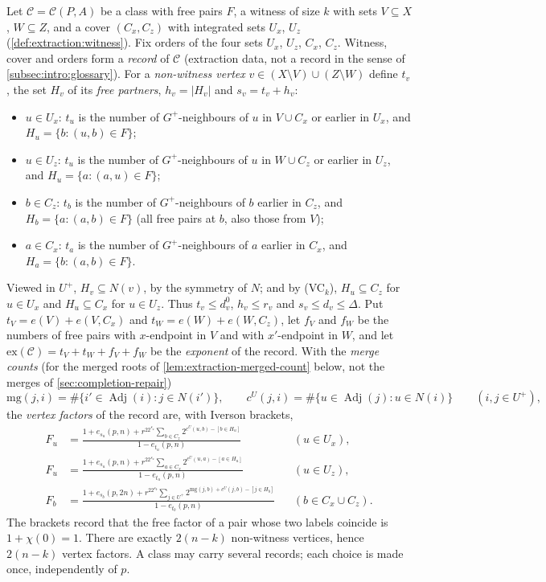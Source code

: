 \begin{definition}\label{def:extraction:records}
Let $\mathcal C=\mathcal C(P,A)$ be a class with free pairs $F$, a witness of
size $k$ with sets $V\subseteq X$, $W\subseteq Z$, and a cover $(C_x,C_z)$ with
integrated sets $U_x$, $U_z$ (\cref{def:extraction:witness}). Fix orders of the
four sets $U_x$, $U_z$, $C_x$, $C_z$. Witness, cover and orders form a
\emph{record} of $\mathcal C$ (extraction data, not a record in the sense of
\cref{subsec:intro:glossary}). For a \emph{non-witness vertex}
$v\in(X\setminus V)\cup(Z\setminus W)$ define $t_v$, the set $H_v$ of its \emph{free
partners}, $h_v=|H_v|$ and $s_v=t_v+h_v$:
\begin{itemize}
\item $u\in U_x$: $t_u$ is the number of $G^+$-neighbours of $u$ in $V\cup C_x$
 or earlier in $U_x$, and $H_u=\{b:(u,b)\in F\}$;
\item $u\in U_z$: $t_u$ is the number of $G^+$-neighbours of $u$ in $W\cup C_z$
 or earlier in $U_z$, and $H_u=\{a:(a,u)\in F\}$;
\item $b\in C_z$: $t_b$ is the number of $G^+$-neighbours of $b$ earlier in
 $C_z$, and $H_b=\{a:(a,b)\in F\}$ (all free pairs at $b$, also those from
 $V$);
\item $a\in C_x$: $t_a$ is the number of $G^+$-neighbours of $a$ earlier in
 $C_x$, and $H_a=\{b:(a,b)\in F\}$.
\end{itemize}
Viewed in $U^+$, $H_v\subseteq N(v)$, by the symmetry of $N$; and by \textup{(VC$_k$)},
$H_u\subseteq C_z$ for $u\in U_x$ and $H_u\subseteq C_x$ for $u\in U_z$. Thus
$t_v\le d^0_v$, $h_v\le r_v$ and $s_v\le d_v\le\Delta$. Put
$t_V=e(V)+e(V,C_x)$ and $t_W=e(W)+e(W,C_z)$, let $f_V$ and $f_W$ be the numbers
of free pairs with $x$-endpoint in $V$ and with $x'$-endpoint in $W$, and let
$\mathrm{ex}(\mathcal C)=t_V+t_W+f_V+f_W$ be the \emph{exponent} of the record.
With the \emph{merge counts} (for the merged roots of
\cref{lem:extraction-merged-count} below, not the merges of
\cref{sec:completion-repair})
\[
 \mathrm{mg}(j,i)=\#\{i'\in\operatorname{Adj}(i):j\in N(i')\},\qquad
 c^U(j,i)=\#\{u\in\operatorname{Adj}(j):u\in N(i)\}\qquad(i,j\in U^+),
\]
the \emph{vertex factors} of the record are, with Iverson brackets,
\begin{align*}
 F_u&=\frac{1+e_{s_u}(p,n)+r^22^{s_u}\sum_{b\in C_z}2^{c^U(u,b)-[b\in H_u]}}
 {1-e_{t_u}(p,n)}&&(u\in U_x),\\
 F_u&=\frac{1+e_{s_u}(p,n)+r^22^{s_u}\sum_{a\in C_x}2^{c^U(u,a)-[a\in H_u]}}
 {1-e_{t_u}(p,n)}&&(u\in U_z),\\
 F_b&=\frac{1+e_{s_b}(p,2n)+r^22^{s_b}\sum_{j\in U^+}
 2^{\mathrm{mg}(j,b)+c^U(j,b)-[j\in H_b]}}{1-e_{t_b}(p,n)}&&(b\in C_x\cup C_z).
\end{align*}
The brackets record that the free factor of a pair whose two labels coincide is
$1+\chi(0)=1$. There are exactly $2(n-k)$ non-witness vertices, hence $2(n-k)$
vertex factors. A class may carry several records; each choice is made once,
independently of $p$.
\end{definition}

